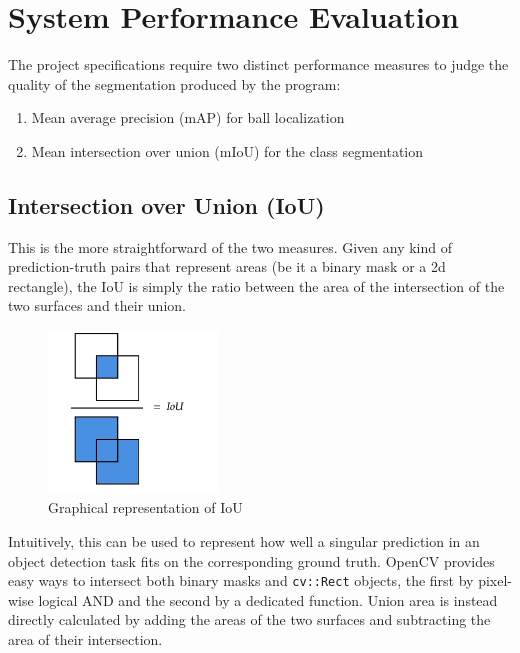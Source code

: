 
\section{System Performance Evaluation}

The project specifications require two distinct performance 
measures to judge the quality of the segmentation produced 
by the program:

\begin{enumerate}
    \item Mean average precision (mAP) for ball localization
    \item Mean intersection over union (mIoU) for the class segmentation
\end{enumerate}



\subsection{Intersection over Union (IoU)}

This is the more straightforward of the two measures. 
Given any kind of prediction-truth pairs that represent 
areas (be it a binary mask or a 2d rectangle), the IoU is 
simply the ratio between the area of the intersection of the 
two surfaces and their union.

\begin{figure}[h]
    \centering
    \includegraphics[width=0.4\textwidth]{./imgs/iou.png}
    \caption{Graphical representation of IoU}
\end{figure}

Intuitively, this can be used to represent how well a singular 
prediction in an object detection task fits on the corresponding 
ground truth.
OpenCV provides easy ways to intersect both binary masks and 
\verb|cv::Rect| objects, the first by pixel-wise logical AND 
and the second by a dedicated function.
Union area is instead directly calculated by adding the 
areas of the two surfaces and subtracting the area of 
their intersection.


